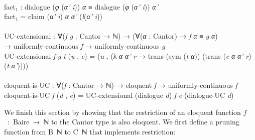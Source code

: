 \documentclass{entcs} \usepackage{prentcsmacro}
\newcommand{\AgdaC}[1]{\mbox{#1}}
\newcommand{\AgdaFontStyle}[1]{\textsf{#1}}
\newcommand{\AgdaBoundFontStyle}[1]{\textit{#1}}
\newcommand{\AgdaSymbol}      [1]{\textcolor{AgdaSymbol}{#1}}
\newcommand{\AgdaBound}    [1]{\AgdaBoundFontStyle{\textcolor{AgdaBound}{#1}}}
\newcommand{\AgdaInductiveConstructor}[1]
    {\AgdaFontStyle{\textcolor{AgdaInductiveConstructor}{#1}}}
\newcommand{\AgdaDatatype} [1]{\AgdaFontStyle{\textcolor{AgdaDatatype}{#1}}}
\newcommand{\AgdaFunction} [1]{\AgdaFontStyle{\textcolor{AgdaFunction}{#1}}}
\newcommand{\AgdaIndent}[1]{\quad}
\newcommand{\AgdaCodeStyle}{\small}
\newenvironment{code}%
{\noindent\AgdaCodeStyle\pboxed}%
{\endpboxed\par\noindent%
\ignorespacesafterend}
\begin{document}
\begin{code}
\\
\>[6]\AgdaIndent{8}{}\<[8]%
\>[8]\AgdaFunction{fact₁} \AgdaSymbol{:} \AgdaFunction{dialogue} \AgdaSymbol{(}\AgdaBound{φ} \AgdaSymbol{(}\AgdaBound{α'} \AgdaBound{i}\AgdaSymbol{))} \AgdaBound{α} \AgdaDatatype{≡} \AgdaFunction{dialogue} \AgdaSymbol{(}\AgdaBound{φ} \AgdaSymbol{(}\AgdaBound{α'} \AgdaBound{i}\AgdaSymbol{))} \AgdaBound{α'}\<%
\\
\>[6]\AgdaIndent{8}{}\<[8]%
\>[8]\AgdaFunction{fact₁} \AgdaSymbol{=} \AgdaFunction{claim} \AgdaSymbol{(}\AgdaBound{α'} \AgdaBound{i}\AgdaSymbol{)} \AgdaBound{α} \AgdaBound{α'} \AgdaSymbol{(}\AgdaBound{l}\AgdaSymbol{(}\AgdaBound{α'} \AgdaBound{i}\AgdaSymbol{))}\<%
\\
%
\\
\>\AgdaFunction{UC-extensional} \AgdaSymbol{:} \AgdaSymbol{∀(}\AgdaBound{f} \AgdaBound{g} \AgdaSymbol{:} \AgdaFunction{Cantor} \AgdaSymbol{→} \AgdaDatatype{ℕ}\AgdaSymbol{)} \AgdaSymbol{→} \AgdaSymbol{(∀(}\AgdaBound{α} \AgdaSymbol{:} \AgdaFunction{Cantor}\AgdaSymbol{)} \AgdaSymbol{→} \AgdaBound{f} \AgdaBound{α} \AgdaDatatype{≡} \AgdaBound{g} \AgdaBound{α}\AgdaSymbol{)} \<[67]%
\>[67]\<%
\\
\>[8]\AgdaIndent{14}{}\<[14]%
\>[14]\AgdaSymbol{→} \AgdaFunction{uniformly-continuous} \AgdaBound{f} \AgdaSymbol{→} \AgdaFunction{uniformly-continuous} \AgdaBound{g}\<%
\\
\>\AgdaFunction{UC-extensional} \AgdaBound{f} \AgdaBound{g} \AgdaBound{t} \AgdaSymbol{(}\AgdaBound{u} \AgdaInductiveConstructor{,} \AgdaBound{c}\AgdaSymbol{)} \AgdaSymbol{=} \AgdaSymbol{(}\AgdaBound{u} \AgdaInductiveConstructor{,} \AgdaSymbol{(λ} \AgdaBound{α} \AgdaBound{α'} \AgdaBound{r} \AgdaSymbol{→} \AgdaFunction{trans} \AgdaSymbol{(}\AgdaFunction{sym} \AgdaSymbol{(}\AgdaBound{t} \AgdaBound{α}\AgdaSymbol{))} \AgdaSymbol{(}\AgdaFunction{trans} \AgdaSymbol{(}\AgdaBound{c} \AgdaBound{α} \AgdaBound{α'} \AgdaBound{r}\AgdaSymbol{)} \AgdaSymbol{(}\AgdaBound{t} \AgdaBound{α'}\AgdaSymbol{))))}\<%
\\
%
\\
\>\AgdaFunction{eloquent-is-UC} \AgdaSymbol{:} \AgdaSymbol{∀(}\AgdaBound{f} \AgdaSymbol{:} \AgdaFunction{Cantor} \AgdaSymbol{→} \AgdaDatatype{ℕ}\AgdaSymbol{)} \AgdaSymbol{→} \AgdaFunction{eloquent} \AgdaBound{f} \AgdaSymbol{→} \AgdaFunction{uniformly-continuous} \AgdaBound{f}\<%
\\
\>\AgdaFunction{eloquent-is-UC} \AgdaBound{f} \AgdaSymbol{(}\AgdaBound{d} \AgdaInductiveConstructor{,} \AgdaBound{e}\AgdaSymbol{)} \AgdaSymbol{=} \AgdaFunction{UC-extensional} \AgdaSymbol{(}\AgdaFunction{dialogue} \AgdaBound{d}\AgdaSymbol{)} \AgdaBound{f} \AgdaBound{e} \AgdaSymbol{(}\AgdaFunction{dialogue-UC} \AgdaBound{d}\AgdaSymbol{)}\<%
\\
\>\<\end{code}
We finish this section by showing that the restriction of an eloquent
function \AgdaC{$f$ : Baire → ℕ} to the Cantor type is also eloquent. We first
define a pruning function from \AgdaC{B ℕ} to \AgdaC{C ℕ} that implements restriction:
\end{document}
